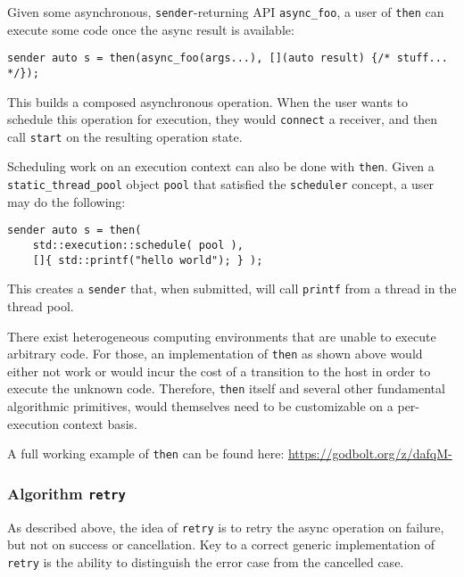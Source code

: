 \documentclass[a4paper,12pt,notitlepage,twoside,openright]{article}
\begin{document}
Given some asynchronous, \texttt{sender}-returning API
\texttt{async_foo}, a user of \texttt{then} can
execute some code once the async result is available:

\begin{verbatim}
sender auto s = then(async_foo(args...), [](auto result) {/* stuff... */});
\end{verbatim}

This builds a composed asynchronous operation. When the user wants to
schedule this operation for execution, they would
\texttt{connect} a receiver, and then call
\texttt{start} on the resulting operation state.

Scheduling work on an execution context can also be done with
\texttt{then}. Given a
\texttt{static_thread_pool} object \texttt{pool}
that satisfied the \texttt{scheduler} concept, a user may do
the following:

\begin{verbatim}
sender auto s = then(
    std::execution::schedule( pool ),
    []{ std::printf("hello world"); } );
\end{verbatim}

This creates a \texttt{sender} that, when submitted, will
call \texttt{printf} from a thread in the thread pool.

There exist heterogeneous computing environments that are unable to
execute arbitrary code. For those, an implementation of
\texttt{then} as shown above would either not work or would
incur the cost of a transition to the host in order to execute the
unknown code. Therefore, \texttt{then} itself and several
other fundamental algorithmic primitives, would themselves need to be
customizable on a per-execution context basis.

A full working example of \texttt{then} can be found here:
\url{https://godbolt.org/z/dafqM-}

\hypertarget{algorithm-retry}{%
\subsubsection{\texorpdfstring{Algorithm
\texttt{retry}}{Algorithm }}\label{algorithm-retry}}

As described above, the idea of \texttt{retry} is to retry
the async operation on failure, but not on success or cancellation. Key
to a correct generic implementation of \texttt{retry} is the
ability to distinguish the error case from the cancelled case.
\end{document}

